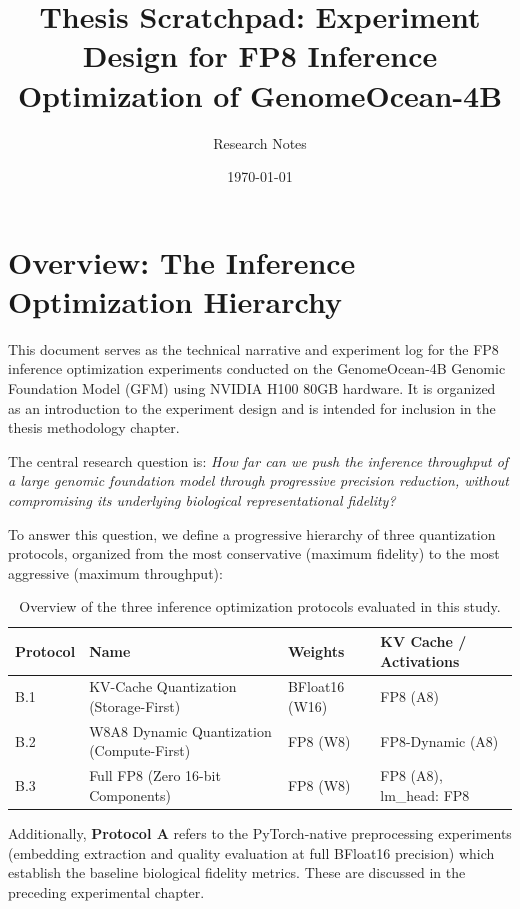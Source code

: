 \documentclass[12pt]{article}
\title{Thesis Scratchpad: Experiment Design for FP8 Inference Optimization of GenomeOcean-4B}
\author{Research Notes}
\date{\today}
\begin{document}
\maketitle

\tableofcontents
\vspace{2em}

\section{Overview: The Inference Optimization Hierarchy}

This document serves as the technical narrative and experiment log for the FP8 inference optimization experiments conducted on the GenomeOcean-4B Genomic Foundation Model (GFM) using NVIDIA H100 80GB hardware. It is organized as an introduction to the experiment design and is intended for inclusion in the thesis methodology chapter.

The central research question is: \textit{How far can we push the inference throughput of a large genomic foundation model through progressive precision reduction, without compromising its underlying biological representational fidelity?}

To answer this question, we define a progressive hierarchy of three quantization protocols, organized from the most conservative (maximum fidelity) to the most aggressive (maximum throughput):

\begin{table}[h]
\centering
\begin{tabular}{llll}
\toprule
\textbf{Protocol} & \textbf{Name} & \textbf{Weights} & \textbf{KV Cache / Activations} \\
\midrule
B.1 & KV-Cache Quantization (Storage-First)  & BFloat16 (W16) & FP8 (A8) \\
B.2 & W8A8 Dynamic Quantization (Compute-First) & FP8 (W8) & FP8-Dynamic (A8) \\
B.3 & Full FP8 (Zero 16-bit Components)     & FP8 (W8) & FP8 (A8), lm\_head: FP8 \\
\bottomrule
\end{tabular}
\caption{Overview of the three inference optimization protocols evaluated in this study.}
\end{table}

Additionally, \textbf{Protocol A} refers to the PyTorch-native preprocessing experiments (embedding extraction and quality evaluation at full BFloat16 precision) which establish the baseline biological fidelity metrics. These are discussed in the preceding experimental chapter.
\end{document}
